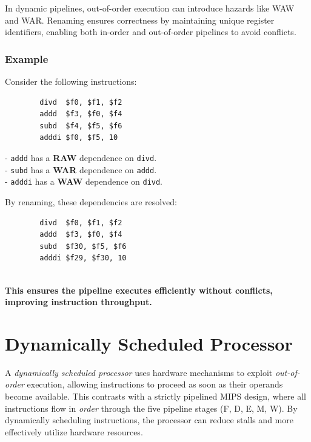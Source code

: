 In dynamic pipelines, out-of-order execution can introduce hazards like WAW and WAR. Renaming ensures correctness by maintaining unique register identifiers, enabling both in-order and out-of-order pipelines to avoid conflicts.

\subsubsection{Example}

Consider the following instructions:\\
\begin{minipage}[t]{0.45\textwidth}
    \begin{verbatim}
        divd  $f0, $f1, $f2
        addd  $f3, $f0, $f4
        subd  $f4, $f5, $f6
        adddi $f0, $f5, 10
    \end{verbatim}
    - \texttt{addd} has a \textbf{RAW} dependence on \texttt{divd}. \\
    - \texttt{subd} has a \textbf{WAR} dependence on \texttt{addd}. \\
    - \texttt{adddi} has a \textbf{WAW} dependence on \texttt{divd}. \\
\end{minipage}
\hfill
\vline
\hfill
\begin{minipage}[t]{0.45\textwidth}
    By renaming, these dependencies are resolved:
    \begin{verbatim}
        divd  $f0, $f1, $f2
        addd  $f3, $f0, $f4
        subd  $f30, $f5, $f6
        adddi $f29, $f30, 10
    \end{verbatim}
\end{minipage} \\ \vspace{10px}
\textbf{This ensures the pipeline executes efficiently without conflicts, improving instruction throughput.}

\newpage
\section{Dynamically Scheduled Processor}
A \emph{dynamically scheduled processor} uses hardware mechanisms to exploit
\emph{out-of-order} execution, allowing instructions to proceed as soon as
their operands become available. This contrasts with a strictly pipelined MIPS
design, where all instructions flow in \emph{order} through the five pipeline
stages (F, D, E, M, W). By dynamically scheduling instructions, the
processor can reduce stalls and more effectively utilize hardware resources.

